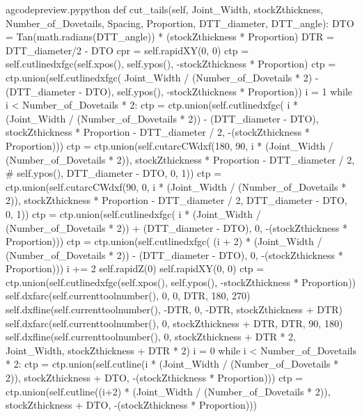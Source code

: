 \documentclass{ltxdoc}
\begin{document}
\lstset{firstnumber=\thegcpy}
\begin{writecode}{a}{gcodepreview.py}{python}
    def cut_tails(self, Joint_Width, stockZthickness, Number_of_Dovetails, Spacing, Proportion, DTT_diameter, DTT_angle):
        DTO = Tan(math.radians(DTT_angle)) * (stockZthickness * Proportion)
        DTR = DTT_diameter/2 - DTO
        cpr = self.rapidXY(0, 0)
        ctp = self.cutlinedxfgc(self.xpos(), self.ypos(), -stockZthickness * Proportion)
        ctp = ctp.union(self.cutlinedxfgc(
            Joint_Width / (Number_of_Dovetails * 2) - (DTT_diameter - DTO), 
            self.ypos(), 
            -stockZthickness * Proportion))
        i = 1
        while i < Number_of_Dovetails * 2:
            ctp = ctp.union(self.cutlinedxfgc(
                i * (Joint_Width / (Number_of_Dovetails * 2)) - (DTT_diameter - DTO), 
                stockZthickness * Proportion - DTT_diameter / 2,
                -(stockZthickness * Proportion)))
            ctp = ctp.union(self.cutarcCWdxf(180, 90, 
                i * (Joint_Width / (Number_of_Dovetails * 2)), 
                stockZthickness * Proportion - DTT_diameter / 2,
#                self.ypos(), 
                DTT_diameter - DTO,  0, 1))
            ctp = ctp.union(self.cutarcCWdxf(90, 0, 
                i * (Joint_Width / (Number_of_Dovetails * 2)), 
                stockZthickness * Proportion - DTT_diameter / 2, 
                DTT_diameter - DTO,  0, 1))
            ctp = ctp.union(self.cutlinedxfgc(
                i * (Joint_Width / (Number_of_Dovetails * 2)) + (DTT_diameter - DTO), 
                0, 
                -(stockZthickness * Proportion)))
            ctp = ctp.union(self.cutlinedxfgc(
                (i + 2) * (Joint_Width / (Number_of_Dovetails * 2)) - (DTT_diameter - DTO), 
                0, 
                -(stockZthickness * Proportion)))
            i += 2
        self.rapidZ(0)
        self.rapidXY(0, 0)
        ctp = ctp.union(self.cutlinedxfgc(self.xpos(), self.ypos(), -stockZthickness * Proportion))
        self.dxfarc(self.currenttoolnumber(), 0, 0, DTR, 180, 270)
        self.dxfline(self.currenttoolnumber(), -DTR, 0, -DTR, stockZthickness + DTR)
        self.dxfarc(self.currenttoolnumber(), 0, stockZthickness + DTR, DTR, 90, 180)
        self.dxfline(self.currenttoolnumber(), 0, stockZthickness + DTR * 2, Joint_Width, stockZthickness + DTR * 2)
        i = 0
        while i < Number_of_Dovetails * 2:
            ctp = ctp.union(self.cutline(i * (Joint_Width / (Number_of_Dovetails * 2)), stockZthickness + DTO, -(stockZthickness * Proportion)))
            ctp = ctp.union(self.cutline((i+2) * (Joint_Width / (Number_of_Dovetails * 2)), stockZthickness + DTO, -(stockZthickness * Proportion)))

\end{writecode}
\end{document}
